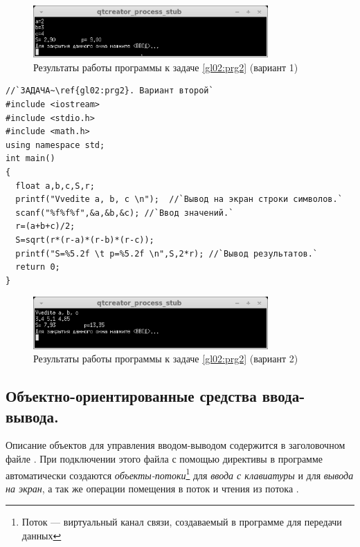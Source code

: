 \begin{figure}[htb]
\begin{center}
\includegraphics[width=0.8\textwidth]{img/ris_2_7}
\caption{Результаты работы программы к задаче \ref{gl02:prg2} (вариант 1)}
\label{ch02:refDrawing6}
\end{center}
\end{figure}

\begin{lstlisting}
//`ЗАДАЧА~\ref{gl02:prg2}. Вариант второй`
#include <iostream>
#include <stdio.h>
#include <math.h>
using namespace std;
int main()
{
  float a,b,c,S,r;
  printf("Vvedite a, b, c \n");  //`Вывод на экран строки символов.`
  scanf("%f%f%f",&a,&b,&c); //`Ввод значений.`
  r=(a+b+c)/2;
  S=sqrt(r*(r-a)*(r-b)*(r-c));
  printf("S=%5.2f \t p=%5.2f \n",S,2*r); //`Вывод результатов.`
  return 0;
}
\end{lstlisting}

\begin{figure}[htb]
\begin{center}
\includegraphics[width=0.8\textwidth]{img/ris_2_8}
\caption{Результаты работы программы к задаче \ref{gl02:prg2} (вариант 2)}
\label{ch02:refDrawing7}
\end{center}
\end{figure}

\subsection[Объектно-ориентированные средства ввода-вывода.]{Объектно-ориентированные средства ввода-вывода.}
Описание объектов для управления вводом-выводом содержится в заголовочном файле . При
подключении этого файла с помощью директивы  в программе
автоматически создаются \emph{объекты-потоки}\footnote{Поток --- виртуальный канал связи, создаваемый в
программе для передачи данных}  для \emph{ввода с клавиатуры} и
 для \emph{вывода на экран}, а так же операции помещения в поток
\Sys{{\textless}{\textless}} и чтения из потока \Sys{{\textgreater}{\textgreater}}.

